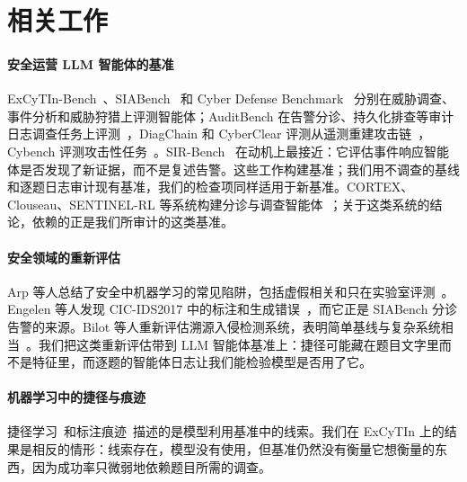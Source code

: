 \section{相关工作}
\label{sec:related}

\paragraph{安全运营 LLM 智能体的基准} ExCyTIn-Bench~\citep{excytin}、SIABench~\citep{siabench} 和 Cyber Defense Benchmark~\citep{cyberdefensebench} 分别在威胁调查、事件分析和威胁狩猎上评测智能体；AuditBench 在告警分诊、持久化排查等审计日志调查任务上评测~\citep{auditbench}，DiagChain 和 CyberClear 评测从遥测重建攻击链~\citep{diagchain,cyberclear}，Cybench 评测攻击性任务~\citep{cybench}。SIR-Bench~\citep{sirbench} 在动机上最接近：它评估事件响应智能体是否发现了新证据，而不是复述告警。这些工作构建基准；我们用不调查的基线和逐题日志审计现有基准，我们的检查项同样适用于新基准。CORTEX、Clouseau、SENTINEL-RL 等系统构建分诊与调查智能体~\citep{cortex,clouseau,sentinelrl}；关于这类系统的结论，依赖的正是我们所审计的这类基准。

\paragraph{安全领域的重新评估} Arp 等人总结了安全中机器学习的常见陷阱，包括虚假相关和只在实验室评测~\citep{arp2022dos}。Engelen 等人发现 CIC-IDS2017 中的标注和生成错误~\citep{engelen2021cicids}，而它正是 SIABench 分诊告警的来源。Bilot 等人重新评估溯源入侵检测系统，表明简单基线与复杂系统相当~\citep{bilot2025simpler}。我们把这类重新评估带到 LLM 智能体基准上：捷径可能藏在题目文字里而不是特征里，而逐题的智能体日志让我们能检验模型是否用了它。

\paragraph{机器学习中的捷径与痕迹} 捷径学习~\citep{geirhos2020shortcut}和标注痕迹~\citep{gururangan2018artifacts}描述的是模型利用基准中的线索。我们在 ExCyTIn 上的结果是相反的情形：线索存在，模型没有使用，但基准仍然没有衡量它想衡量的东西，因为成功率只微弱地依赖题目所需的调查。
